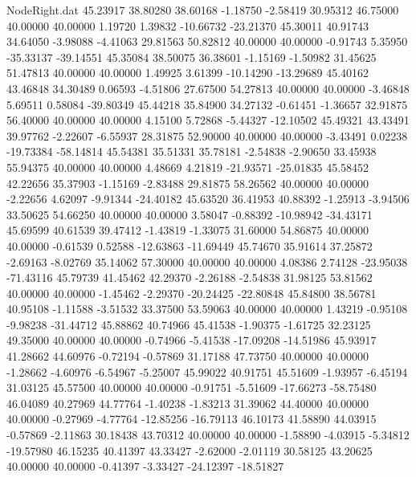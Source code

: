 \begin{filecontents}{NodeRight.dat}
  45.23917   38.80280   38.60168    -1.18750   -2.58419   30.95312   46.75000   40.00000   40.00000    1.19720    1.39832  -10.66732  -23.21370
  45.30011   40.91743   34.64050    -3.98088   -4.41063   29.81563   50.82812   40.00000   40.00000   -0.91743    5.35950  -35.33137  -39.14551
  45.35084   38.50075   36.38601    -1.15169   -1.50982   31.45625   51.47813   40.00000   40.00000    1.49925    3.61399  -10.14290  -13.29689
  45.40162   43.46848   34.30489     0.06593   -4.51806   27.67500   54.27813   40.00000   40.00000   -3.46848    5.69511    0.58084  -39.80349
  45.44218   35.84900   34.27132    -0.61451   -1.36657   32.91875   56.40000   40.00000   40.00000    4.15100    5.72868   -5.44327  -12.10502
  45.49321   43.43491   39.97762    -2.22607   -6.55937   28.31875   52.90000   40.00000   40.00000   -3.43491    0.02238  -19.73384  -58.14814
  45.54381   35.51331   35.78181    -2.54838   -2.90650   33.45938   55.94375   40.00000   40.00000    4.48669    4.21819  -21.93571  -25.01835
  45.58452   42.22656   35.37903    -1.15169   -2.83488   29.81875   58.26562   40.00000   40.00000   -2.22656    4.62097   -9.91344  -24.40182
  45.63520   36.41953   40.88392    -1.25913   -3.94506   33.50625   54.66250   40.00000   40.00000    3.58047   -0.88392  -10.98942  -34.43171
  45.69599   40.61539   39.47412    -1.43819   -1.33075   31.60000   54.86875   40.00000   40.00000   -0.61539    0.52588  -12.63863  -11.69449
  45.74670   35.91614   37.25872    -2.69163   -8.02769   35.14062   57.30000   40.00000   40.00000    4.08386    2.74128  -23.95038  -71.43116
  45.79739   41.45462   42.29370    -2.26188   -2.54838   31.98125   53.81562   40.00000   40.00000   -1.45462   -2.29370  -20.24425  -22.80848
  45.84800   38.56781   40.95108    -1.11588   -3.51532   33.37500   53.59063   40.00000   40.00000    1.43219   -0.95108   -9.98238  -31.44712
  45.88862   40.74966   45.41538    -1.90375   -1.61725   32.23125   49.35000   40.00000   40.00000   -0.74966   -5.41538  -17.09208  -14.51986
  45.93917   41.28662   44.60976    -0.72194   -0.57869   31.17188   47.73750   40.00000   40.00000   -1.28662   -4.60976   -6.54967   -5.25007
  45.99022   40.91751   45.51609    -1.93957   -6.45194   31.03125   45.57500   40.00000   40.00000   -0.91751   -5.51609  -17.66273  -58.75480
  46.04089   40.27969   44.77764    -1.40238   -1.83213   31.39062   44.40000   40.00000   40.00000   -0.27969   -4.77764  -12.85256  -16.79113
  46.10173   41.58890   44.03915    -0.57869   -2.11863   30.18438   43.70312   40.00000   40.00000   -1.58890   -4.03915   -5.34812  -19.57980
  46.15235   40.41397   43.33427    -2.62000   -2.01119   30.58125   43.20625   40.00000   40.00000   -0.41397   -3.33427  -24.12397  -18.51827

\end{filecontents}
